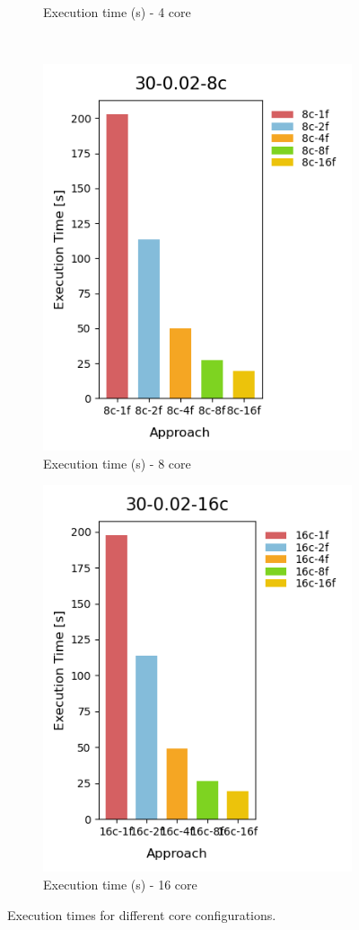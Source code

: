 \begin{figure}[H]
\begin{subfigure}[b]{0.45\textwidth}
    \caption{Execution time (s) - 4 core}
  \end{subfigure}
  \\
  \begin{subfigure}[b]{0.45\textwidth}
    \centering
    \includegraphics[scale=0.6]{images/4-Experiments/E2/30-0.02-8c/execTime.png}
    \caption{Execution time (s) - 8 core}
  \end{subfigure}
  \hfill
  \begin{subfigure}[b]{0.45\textwidth}
    \centering
    \includegraphics[scale=0.6]{images/4-Experiments/E2/30-0.02-16c/execTime.png}
    \caption{Execution time (s) - 16 core}
  \end{subfigure}
  \caption{Execution times for different core configurations.}
  \label{fig:execution-times}
\end{figure}


